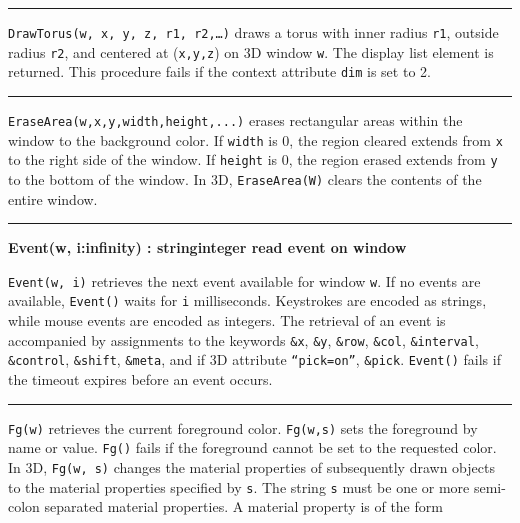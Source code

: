 \bigskip\hrule\vspace{0.1cm}

\noindent
\texttt{DrawTorus(w, x, y, z, r1, r2,{\dots})} draws a torus with
inner radius \texttt{r1}, outside radius \texttt{r2}, and centered at
(\texttt{x,y,z}) on 3D window \texttt{w}. The display list element is
returned. This procedure fails if the context attribute \texttt{dim} is
set to 2.

\bigskip\hrule\vspace{0.1cm}

\noindent
\texttt{EraseArea(w,x,y,width,height,...)} erases rectangular areas
within the window to the background color. If \texttt{width} is 0,
the region cleared extends from \texttt{x} to the right side of the
window. If \texttt{height} is 0, the region erased extends from
\texttt{y} to the bottom of the window. In 3D, \texttt{EraseArea(W)}
clears the contents of the entire window.

\bigskip\hrule\vspace{0.1cm}
\noindent
{\bf Event(w, i:infinity) : string{\textbar}integer \hfill  read event on window}

\noindent
\texttt{Event(w, i)} retrieves the next event available for window
\texttt{w}. If no events are available, \texttt{Event()} waits for
\texttt{i} milliseconds. Keystrokes are encoded as strings, while mouse
events are encoded as integers. The retrieval of an event is
accompanied by assignments to the keywords \texttt{\&x}, \texttt{\&y},
\texttt{\&row}, \texttt{\&col}, \texttt{\&interval},
\texttt{\&control}, \texttt{\&shift}, \texttt{\&meta}, and if 3D
attribute \texttt{{\textquotedblleft}pick=on{\textquotedblright}},
\texttt{\&pick}. \texttt{Event()} fails if the timeout expires before
an event occurs.

\bigskip\hrule\vspace{0.1cm}

\noindent
\texttt{Fg(w)} retrieves the current foreground color. \texttt{Fg(w,s)}
sets the foreground by name or value. \texttt{Fg()} fails if the
foreground cannot be set to the requested color. In 3D, \texttt{Fg(w,
s)} changes the material properties of subsequently drawn objects to
the material properties specified by \texttt{s}. The string \texttt{s}
must be one or more semi-colon separated material properties. A
material property is of the form 

